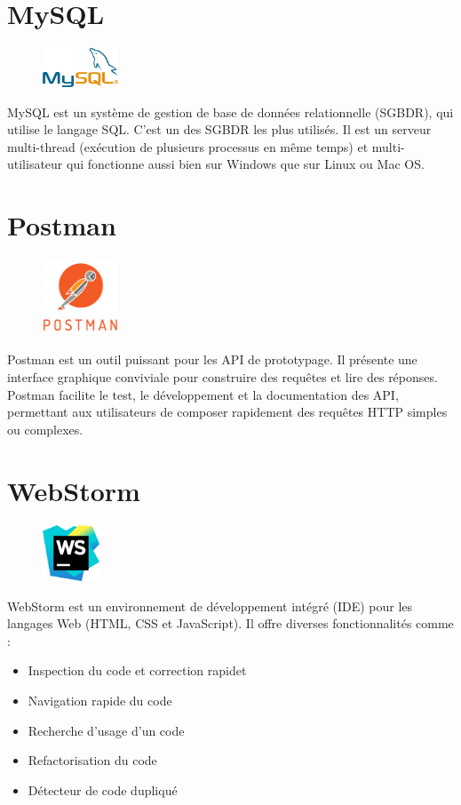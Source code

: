 \section{MySQL}
\begin{figure}[h!]  
 \centering
    \includegraphics[width=0.2\textwidth]{annexe/Figures/mysql.png}
\end{figure}
MySQL est un système de gestion de base de données relationnelle (SGBDR), qui utilise le langage SQL. C'est un des SGBDR les plus utilisés.  Il est un serveur multi-thread (exécution de plusieurs processus en même temps) et multi-utilisateur qui fonctionne aussi bien sur Windows que sur Linux ou Mac OS.

\section{Postman}
\begin{figure}[h!]  
 \centering
    \includegraphics[width=0.2\textwidth]{annexe/Figures/postman.png}
\end{figure}
Postman est un outil puissant pour les API de prototypage. Il présente une interface graphique conviviale pour construire des requêtes et lire des réponses.  Postman facilite le test, le développement et la documentation des API, permettant aux utilisateurs de composer rapidement des requêtes HTTP simples ou complexes.

\newpage

\section{WebStorm}
\begin{figure}[h!]  
 \centering
    \includegraphics[width=0.15\textwidth]{annexe/Figures/webstorm.png}
\end{figure}
WebStorm est un environnement de développement intégré (IDE) pour les langages Web (HTML, CSS et JavaScript). Il offre diverses fonctionnalités comme :
\begin{itemize}[label=\textbullet]
\item Inspection du code et correction rapidet
\item Navigation rapide du code
\item Recherche d'usage d'un code
\item Refactorisation du code 
\item Détecteur de code dupliqué 
\end{itemize}
